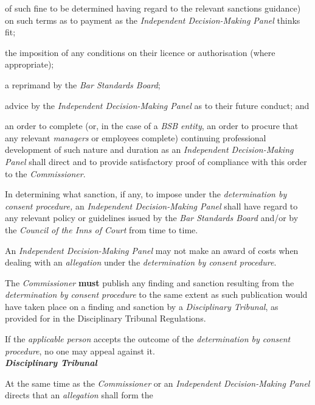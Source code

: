 of such fine to be determined having regard to the relevant sanctions
guidance) on such terms as to payment as the \emph{Independent
Decision-Making Panel} thinks fit;\item the imposition of any conditions on their licence or authorisation
(where appropriate);\item a reprimand by the \emph{Bar Standards Board};\item advice by the \emph{Independent Decision-Making Panel} as to their
future conduct; and\item an order to complete (or, in the case of a \emph{BSB entity}, an
order to procure that any relevant \emph{managers} or employees
complete) continuing professional development of such nature and
duration as an \emph{Independent Decision-Making Panel }shall direct and
to provide satisfactory proof of compliance with this order to
the \emph{Commissioner}.\ln
{}\par
In determining what sanction, if any, to impose under
the \emph{determination by consent procedure,} an \emph{Independent
Decision-Making Panel }shall have regard to any relevant policy or
guidelines issued by the \emph{Bar Standards Board} and/or by
the \emph{Council of the Inns of Court} from time to time.\\
\par
An \emph{Independent Decision-Making Panel }may not make an award of
costs when dealing with an \emph{allegation} under
the \emph{determination by consent procedure}.\\
\par
The \emph{Commissioner}  \textcolor{myred}{\textbf{must}} publish any finding and sanction resulting
from the \emph{determination by consent procedure} to the same extent as
such publication would have taken place on a finding and sanction by
a \emph{Disciplinary Tribunal}, as provided for in the Disciplinary
Tribunal Regulations.\\
\par
If the \emph{applicable person} accepts the outcome of
the \emph{determination by consent procedure}, no one may appeal against
it.\\
\textbf{\emph{Disciplinary Tribunal}}\par
{}\par
At the same time as the \emph{Commissioner }or an \emph{Independent
Decision-Making Panel }directs that an \emph{allegation} shall form the
